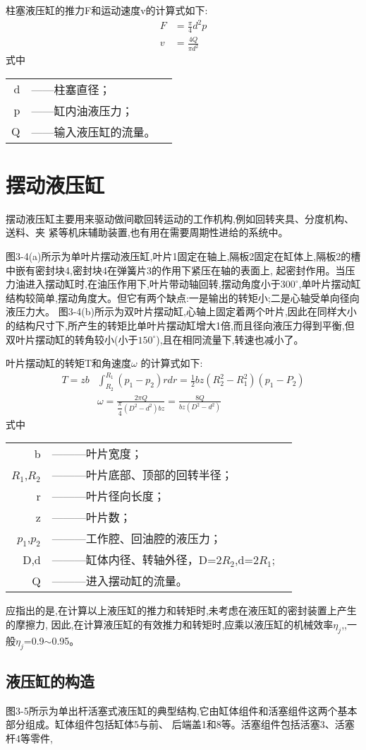 柱塞液压缸的推力F和运动速度v的计算式如下:
\begin{align}
    F&=\frac{\pi}{4}d^2p\\
    v&=\frac{4Q}{\pi d^2}
\end{align}
式中
\begin{tabular}[t]{rll}
    d&——柱塞直径；\\
    p&——缸内油液压力；\\
    Q&——输入液压缸的流量。\\
\end{tabular}

\section{摆动液压缸}
摆动液压缸主要用来驱动做间歇回转运动的工作机构,例如回转夹具、分度机构、送料、夹
\newpage
\noindent
紧等机床辅助装置,也有用在需要周期性进给的系统中。

图3-4(a)所示为单叶片摆动液压缸,叶片1固定在轴上,隔板2固定在缸体上,隔板2的槽中嵌有密封块4,密封块4在弹簧片3的作用下紧压在轴的表面上,
起密封作用。当压力油进入摆动缸时,在油压作用下,叶片带动轴回转,摆动角度小于$300^\circ$,单叶片摆动缸结构较简单,摆动角度大。但它有两个缺点:一是输出的转矩小;二是心轴受单向径向液压力大。
图3-4(b)所示为双叶片摆动缸,心轴上固定着两个叶片,因此在同样大小的结构尺寸下,所产生的转矩比单叶片摆动缸增大1倍,而且径向液压力得到平衡,但双叶片摆动缸的转角较小(小于$150^\circ$),且在相同流量下,转速也减小了。

叶片摆动缸的转矩T和角速度$\omega$ 的计算式如下:
\begin{align}
    T=zb&\int_{R_2}^{R_1}(p_1-p_2)rdr=\frac{1}{2}bz(R_2^2-R^2_1)(p_1-P_2)\\
    &\omega =\frac{2\pi Q}{\dfrac{\pi}{4}(D^2-d^2)bz}=\frac{8Q}{bz(D^2-d^2)}
\end{align}
式中
\begin{tabular}[t]{rll}
    \centering
    b&———叶片宽度；\\
    $R_1$,$R_2$ &———叶片底部、顶部的回转半径；\\
    r&———叶片径向长度；\\
    z&———叶片数；\\
    $p_1$,$p_2$ &———工作腔、回油腔的液压力；\\
    D,d&———缸体内径、转轴外径，D=2$R_2$,d=2$R_1$;\\
    Q&———进入摆动缸的流量。
\end{tabular}

应指出的是,在计算以上液压缸的推力和转矩时,未考虑在液压缸的密封装置上产生的摩擦力,
因此,在计算液压缸的有效推力和转矩时,应乘以液压缸的机械效率$\eta _j$,,一般$\eta _j$=0.9$\sim $0.95。

\begin{center}    
\subsection{液压缸的构造}
\end{center}

图3-5所示为单出杆活塞式液压缸的典型结构,它由缸体组件和活塞组件这两个基本部分组成。缸体组件包括缸体5与前、
后端盖1和8等。活塞组件包括活塞3、活塞杆4等零件,



